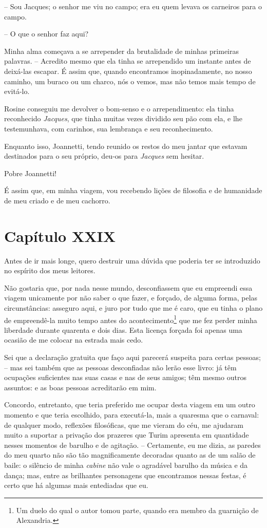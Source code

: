  -- Sou Jacques; o senhor me viu no campo; era eu quem levava os
carneiros para o campo.

 -- O que o senhor faz aqui?

 Minha alma começava a se arrepender da brutalidade de minhas primeiras
palavras. -- Acredito mesmo que ela tinha se arrependido um instante
antes de deixá-las escapar. É assim que, quando encontramos
inopinadamente, no nosso caminho, um buraco ou um charco, nós o vemos,
mas não temos mais tempo de evitá-lo.

 Rosine conseguiu me devolver o bom-senso e o arrependimento: ela tinha
reconhecido \textit{Jacques}, que tinha muitas vezes dividido seu pão
com ela, e lhe testemunhava, com carinhos, sua lembrança e seu
reconhecimento.

 Enquanto isso, Joannetti, tendo reunido os restos do meu jantar que
estavam destinados para o seu próprio, deu-os para \textit{Jacques} sem
hesitar.

 Pobre Joannetti!

 É assim que, em minha viagem, vou recebendo lições de filosofia e de
humanidade de meu criado e de meu cachorro.

\section*{Capítulo XXIX}

 Antes de ir mais longe, quero destruir uma dúvida que poderia ter se
introduzido no espírito dos meus leitores. 

 Não gostaria que, por nada nesse mundo, desconfiassem que eu empreendi
essa viagem unicamente por não saber o que fazer, e forçado, de alguma
forma, pelas circunstâncias: asseguro aqui, e juro por tudo que me é
caro, que eu tinha o plano de empreendê-la muito tempo antes do
acontecimento\footnote{ Um duelo do qual o autor tomou parte, quando
era membro da guarnição de Alexandria.}  que me fez perder minha
liberdade durante quarenta e dois dias. Esta licença forçada foi apenas
uma ocasião de me colocar na estrada mais cedo.

 Sei que a declaração gratuita que faço aqui parecerá suspeita para
certas pessoas; -- mas sei também que as pessoas desconfiadas não
lerão esse livro: já têm ocupações suficientes nas suas casas e nas de
seus amigos; têm mesmo outros assuntos: e as boas pessoas acreditarão
em mim.

 Concordo, entretanto, que teria preferido me ocupar desta viagem em um
outro momento e que teria escolhido, para executá-la, mais a quaresma
que o carnaval: de qualquer modo, reflexões filosóficas, que me vieram
do céu, me ajudaram muito a suportar a privação dos prazeres que Turim
apresenta em quantidade nesses momentos de barulho e de agitação. --
Certamente, eu me dizia, as paredes do meu quarto não são tão
magnificamente decoradas quanto as de um salão de baile: o silêncio de
minha \textit{cabine} não vale o agradável barulho da música e da
dança; mas, entre as brilhantes personagens que encontramos nessas
festas, é certo que há algumas mais entediadas que eu. 

